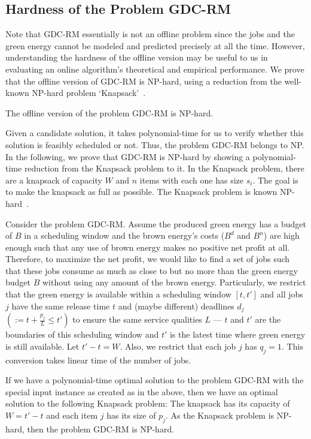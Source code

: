 \documentclass[conference]{IEEEtran}
\begin{document}
\subsection{Hardness of the Problem GDC-RM}
\label{appendix_GDC-RM_hardness}
Note that GDC-RM essentially is not an offline problem since the jobs and the green energy cannot be modeled and predicted precisely at all the time. However, understanding the hardness of the offline version may be useful to us in evaluating an online algorithm's theoretical and empirical performance. We prove that the offline version of GDC-RM is NP-hard, using a reduction from the well-known NP-hard problem `Knapsack'~\cite{GareyJ79}.

\begin{theorem}
The offline version of the problem GDC-RM is NP-hard.
\label{thm:nphard}
\end{theorem}

\begin{IEEEproof}
Given a candidate solution, it takes polynomial-time for us to verify whether this solution is feasibly scheduled or not. Thus, the problem GDC-RM belongs to NP. In the following, we prove that GDC-RM is NP-hard by showing a polynomial-time reduction from the Knapsack problem to it. In the Knapsack problem, there are a knapsack of capacity $W$ and $n$ items with each one has size $s_i$. The goal is to make the knapsack as full as possible. The Knapsack problem is known NP-hard~\cite{GareyJ79}.

Consider the problem GDC-RM. Assume the produced green energy has a budget of $B$ in a scheduling window and the brown energy's costs ($B^d$ and $B^n$) are high enough such that any use of brown energy makes no positive net profit at all. Therefore, to maximize the net profit, we would like to find a set of jobs such that these jobs consume as much as close to but no more than the green energy budget $B$ without using any amount of the brown energy. Particularly, we restrict that the green energy is available within a scheduling window $[t, t']$ and all jobs $j$ have the same release time $t$ and (maybe different) deadlines $d_j$ $\left(:= t + \frac{p_j}{L} \le t'\right)$ to ensure the same service qualities $L$ --- $t$ and $t'$ are the boundaries of this scheduling window and $t'$ is the latest time where green energy is still available. Let $t' - t = W$. Also, we restrict that each job $j$ has $q_j = 1$. This conversion takes linear time of the number of jobs.

If we have a polynomial-time optimal solution to the problem GDC-RM with the special input instance as created as in the above, then we have an optimal solution to the following Knapsack problem: The knapsack has its capacity of $W = t' - t$ and each item $j$ has its size of $p_j$. As the Knapsack problem is NP-hard, then the problem GDC-RM is NP-hard.
\end{IEEEproof}
\end{document}
